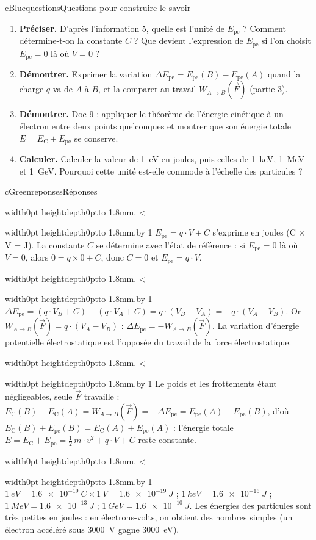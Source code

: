 \documentclass[11pt,a4paper]{article}
\newcommand{\vect}[1]{\overrightarrow{#1}}
\newcommand{\Ec}{E_{\mathrm{C}}}
\newcommand{\kw}[1]{{\sffamily\bfseries\color{cBlue}#1}}   %
\newif\ifeleve
\newlength{\interligne}\setlength{\interligne}{7mm}
\newlength{\replen}
\newcommand{\pointilles}{{\color{cInk2!60}\leaders\hbox to 1.8mm{\hss.\hss}\hfill}\kern0pt}
\newcommand{\lignes}[1]{\leavevmode\vrule width0pt height\dimexpr\interligne-1mm\relax depth0pt\pointilles
  \lgn=1 \loop\ifnum\lgn<#1 \par\nointerlineskip\noindent\vrule width0pt height\interligne depth0pt\pointilles\advance\lgn by 1 \repeat}
\newcommand{\rep}[1]{%
  \ifeleve
    \sbox{\repbox}{\parbox{\linewidth}{#1}}%
    \replen=\dimexpr\ht\repbox+\dp\repbox\relax
    \repn=\numexpr\replen/\baselineskip+1\relax
    \ifnum\repn<2 \repn=2\fi
    \edef\nblignes{\the\repn}\lignes{\nblignes}%
  \else #1\fi}
\newcommand{\titrereponses}{\ifeleve Mes réponses\else Réponses\fi}
\newcommand{\Epe}{E_{\mathrm{pe}}}
\newcommand{\W}[2]{W_{#1\rightarrow #2}(\vect{F})}
\begin{document}
\begin{rub}{cBlue}{questions}{Questions pour construire le savoir}
\begin{enumerate}
  \item \kw{Préciser.} D’après l’information 5, quelle est l’unité de $\Epe$ ? Comment détermine-t-on la constante $C$ ? Que devient l’expression de $\Epe$ si l’on choisit $\Epe = 0$ là où $V = 0$ ?
  \item \kw{Démontrer.} Exprimer la variation $\Delta\Epe = \Epe(B) - \Epe(A)$ quand la charge $q$ va de $A$ à $B$, et la comparer au travail $\W{A}{B}$ (partie 3).
  \item \kw{Démontrer.} Doc 9 : appliquer le théorème de l’énergie cinétique à un électron entre deux points quelconques et montrer que son énergie totale $E = \Ec + \Epe$ se conserve.
  \item \kw{Calculer.} Calculer la valeur de \qty{1}{eV} en joules, puis celles de \qty{1}{keV}, \qty{1}{MeV} et \qty{1}{GeV}. Pourquoi cette unité est-elle commode à l’échelle des particules ?
\end{enumerate}
\end{rub}

\begin{rub}{cGreen}{reponses}{\titrereponses}
\begin{reps}
  \item \rep{$\Epe = q\cdot V + C$ s’exprime en joules (C × V = J). La constante $C$ se détermine avec l’état de référence : si $\Epe = 0$ là où $V = 0$, alors $0 = q\times0 + C$, donc $C = 0$ et $\Epe = q\cdot V$.}
  \item \rep{$\Delta\Epe = (q\cdot V_B + C) - (q\cdot V_A + C) = q\cdot(V_B - V_A) = -q\cdot(V_A - V_B)$. Or $\W{A}{B} = q\cdot(V_A - V_B)$ : $\Delta\Epe = -\W{A}{B}$. La variation d’énergie potentielle électrostatique est l’opposée du travail de la force électrostatique.}
  \item \rep{Le poids et les frottements étant négligeables, seule $\vect{F}$ travaille : $\Ec(B) - \Ec(A) = \W{A}{B} = -\Delta\Epe = \Epe(A) - \Epe(B)$, d’où $\Ec(B) + \Epe(B) = \Ec(A) + \Epe(A)$ : l’énergie totale $E = \Ec + \Epe = \frac{1}{2}\,m\cdot v^2 + q\cdot V + C$ reste constante.}
  \item \rep{$\qty{1}{eV} = \qty{1,6e-19}{C}\times\qty{1}{V} = \qty{1,6e-19}{J}$ ; $\qty{1}{keV} = \qty{1,6e-16}{J}$ ; $\qty{1}{MeV} = \qty{1,6e-13}{J}$ ; $\qty{1}{GeV} = \qty{1,6e-10}{J}$. Les énergies des particules sont très petites en joules : en électrons-volts, on obtient des nombres simples (un électron accéléré sous \qty{3000}{V} gagne \qty{3000}{eV}).}
\end{reps}
\end{rub}
\end{document}
